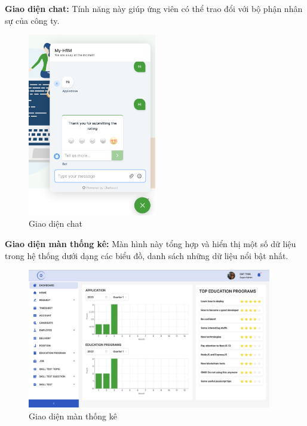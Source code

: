 \documentclass[../DoAn.tex]{subfiles}
\begin{document}
\textbf{Giao diện chat:}
Tính năng này giúp ứng viên có thể trao đổi với bộ phận nhân sự của công ty.
\begin{figure}[H]
    \centering
    \includegraphics[width=0.5\textwidth]{Hinhve/TinhNangChat.png}
    \caption{Giao diện chat}
\end{figure}

\textbf{Giao diện màn thống kê:}
Màn hình này tổng hợp và hiển thị một số dữ liệu trong hệ thống dưới dạng các biểu đồ, danh sách những dữ liệu nổi bật nhất.
\begin{figure}[H]
    \centering
    \includegraphics[width=0.95\textwidth]{Hinhve/AdminDashboard.png}
    \caption{Giao diện màn thống kê}
\end{figure}
\end{document}
